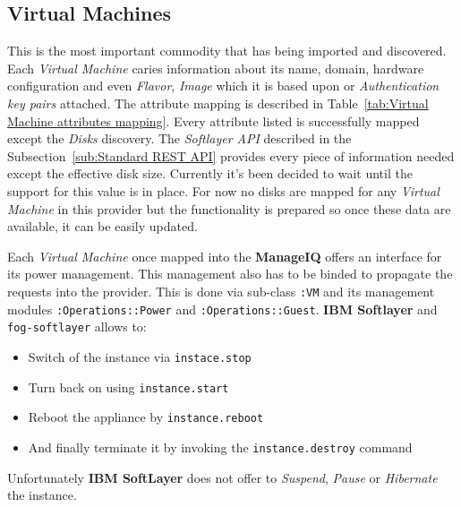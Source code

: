 \subsection{Virtual Machines}
\label{sub:Virtual Machines}

This is the most important commodity that has being imported and discovered. Each \emph{Virtual Machine} caries information about its name, domain, hardware configuration and even \emph{Flavor}, \emph{Image} which it is based upon or \emph{Authentication key pairs} attached. The attribute mapping is described in Table~\ref{tab:Virtual Machine attributes mapping}. Every attribute listed is successfully mapped except the \emph{Disks} discovery. The \emph{Softlayer API} described in the Subsection~\ref{sub:Standard REST API} provides every piece of information needed except the effective disk size. Currently it's been decided to wait until the support for this value is in place. For now no disks are mapped for any \emph{Virtual Machine} in this provider but the functionality is prepared so once these data are available, it can be easily updated.

Each \emph{Virtual Machine} once mapped into the \textbf{ManageIQ} offers an interface for its power management. This management also has to be binded to propagate the requests into the provider. This is done via sub-class \verb|:VM| and its management modules \verb|:Operations::Power| and \verb|:Operations::Guest|. \textbf{IBM Softlayer} and \texttt{fog-softlayer} allows to:

\begin{itemize}
	\item Switch of the instance via \verb|instace.stop|
	\item Turn back on using \verb|instance.start|
	\item Reboot the appliance by \verb|instance.reboot|
	\item And finally terminate it by invoking the \verb|instance.destroy| command
\end{itemize}

Unfortunately \textbf{IBM SoftLayer} does not offer to \emph{Suspend}, \emph{Pause} or \emph{Hibernate} the instance.

